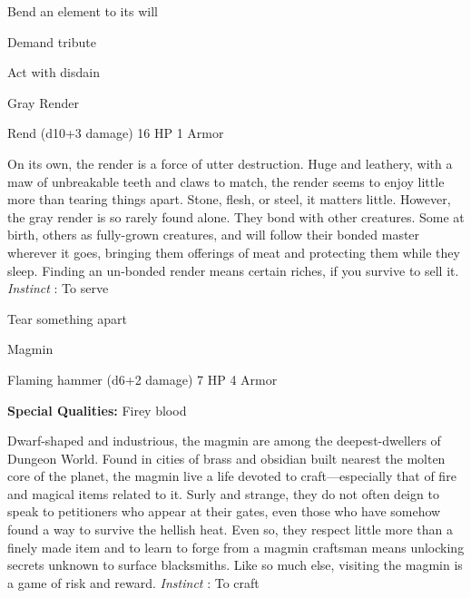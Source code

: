 \startitemize[1,packed]

\item Bend an element to its will

 
\item Demand tribute

 
\item Act with disdain


\stopitemize
 
\startMonsterName
Gray Render	 
\stopMonsterName
 

Rend (d10+3 damage)	16 HP	1 Armor

 


 
\startMonsterDescription
On its own, the render is a force of utter destruction. Huge and leathery, with a maw of unbreakable teeth and claws to match, the render seems to enjoy little more than tearing things apart. Stone, flesh, or steel, it matters little. However, the gray render is so rarely found alone. They bond with other creatures. Some at birth, others as fully-grown creatures, and will follow their bonded master wherever it goes, bringing them offerings of meat and protecting them while they sleep. Finding an un-bonded render means certain riches, if you survive to sell it. {\em Instinct} : To serve
\stopMonsterDescription
 
\startitemize[1,packed]

\item Tear something apart


\stopitemize
 
\startMonsterName
Magmin	 
\stopMonsterName
 

Flaming hammer (d6+2 damage)	7 HP	4 Armor

 


 
\startMonsterQualities
{\bf Special Qualities:}  Firey blood
\stopMonsterQualities
 
\startMonsterDescription
Dwarf-shaped and industrious, the magmin are among the deepest-dwellers of Dungeon World. Found in cities of brass and obsidian built nearest the molten core of the planet, the magmin live a life devoted to craft—especially that of fire and magical items related to it. Surly and strange, they do not often deign to speak to petitioners who appear at their gates, even those who have somehow found a way to survive the hellish heat. Even so, they respect little more than a finely made item and to learn to forge from a magmin craftsman means unlocking secrets unknown to surface blacksmiths. Like so much else, visiting the magmin is a game of risk and reward. {\em Instinct} : To craft
\stopMonsterDescription
 
